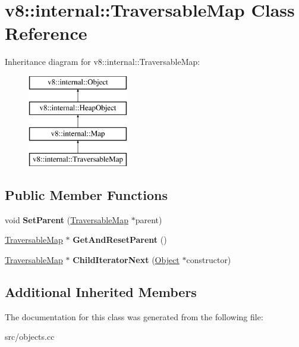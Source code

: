\hypertarget{classv8_1_1internal_1_1_traversable_map}{}\section{v8\+:\+:internal\+:\+:Traversable\+Map Class Reference}
\label{classv8_1_1internal_1_1_traversable_map}
Inheritance diagram for v8\+:\+:internal\+:\+:Traversable\+Map\+:\begin{figure}[H]
\begin{center}
\leavevmode
\includegraphics[height=4.000000cm]{classv8_1_1internal_1_1_traversable_map}
\end{center}
\end{figure}
\subsection*{Public Member Functions}
\begin{DoxyCompactItemize}
\item 
\hypertarget{classv8_1_1internal_1_1_traversable_map_a765fe153b3d3b40fbf580e5ff272154c}{}void {\bfseries Set\+Parent} (\hyperlink{classv8_1_1internal_1_1_traversable_map}{Traversable\+Map} $\ast$parent)\label{classv8_1_1internal_1_1_traversable_map_a765fe153b3d3b40fbf580e5ff272154c}

\item 
\hypertarget{classv8_1_1internal_1_1_traversable_map_ade456d96cba6ba093425af5b5730bf2a}{}\hyperlink{classv8_1_1internal_1_1_traversable_map}{Traversable\+Map} $\ast$ {\bfseries Get\+And\+Reset\+Parent} ()\label{classv8_1_1internal_1_1_traversable_map_ade456d96cba6ba093425af5b5730bf2a}

\item 
\hypertarget{classv8_1_1internal_1_1_traversable_map_a6c226525b026e5fa5ede80d660e853e3}{}\hyperlink{classv8_1_1internal_1_1_traversable_map}{Traversable\+Map} $\ast$ {\bfseries Child\+Iterator\+Next} (\hyperlink{classv8_1_1internal_1_1_object}{Object} $\ast$constructor)\label{classv8_1_1internal_1_1_traversable_map_a6c226525b026e5fa5ede80d660e853e3}

\end{DoxyCompactItemize}
\subsection*{Additional Inherited Members}


The documentation for this class was generated from the following file\+:\begin{DoxyCompactItemize}
\item 
src/objects.\+cc\end{DoxyCompactItemize}
